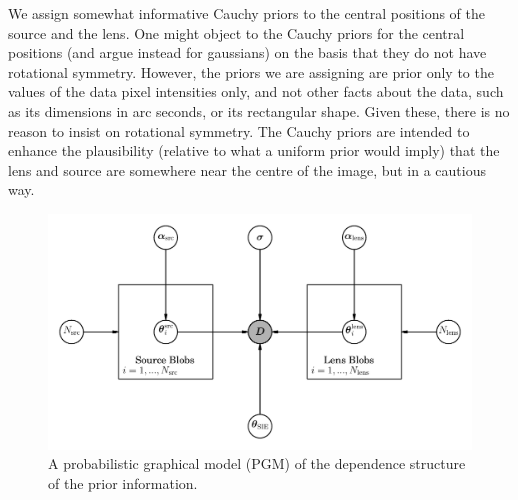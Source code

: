 \documentclass[useAMS,usenatbib]{mn2e}
\begin{document}
We assign somewhat informative Cauchy priors to the central positions of the
source and the lens.
One might object to the Cauchy priors
for the central positions (and argue instead for gaussians) on the
basis that they do not have rotational symmetry. However, the priors we
are assigning are prior only to the values of the data pixel intensities only,
and not other facts about the data, such as its dimensions in arc seconds, or its
rectangular shape. Given these, there is no reason to insist on rotational
symmetry. The Cauchy priors are intended to enhance the plausibility
(relative to what a uniform prior would imply) that the
lens and source are somewhere near the centre of the image, but in a cautious
way.


\begin{figure}
\includegraphics{pgm.pdf}
\caption{A probabilistic graphical model (PGM) of the dependence structure
of the prior information.\label{fig:pgm}}
\end{figure}
\end{document}
